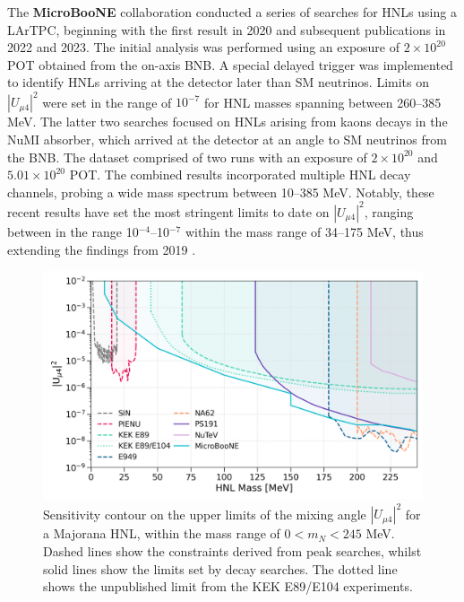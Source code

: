\begin{coloritemize}
\item The \textbf{MicroBooNE} collaboration conducted a series of searches for HNLs using a LArTPC, beginning with the first result in 2020 and subsequent publications in 2022 and 2023.
The initial analysis was performed using an exposure of $2 \times 10^{20}$ POT obtained from the on-axis BNB.
A special delayed trigger was implemented to identify HNLs arriving at the detector later than SM neutrinos.
Limits on $|U_{\mu4}|^{2}$ were set in the range of $10^{-7}$ for HNL masses spanning between 260--385 MeV.
The latter two searches focused on HNLs arising from kaons decays in the NuMI absorber, which arrived at the detector at an angle to SM neutrinos from the BNB.
The dataset comprised of two runs with an exposure of $2 \times 10^{20}$ and $5.01 \times 10^{20}$ POT.
The combined results incorporated multiple HNL decay channels, probing a wide mass spectrum between 10--385 MeV.
Notably, these recent results have set the most stringent limits to date on $|U_{\mu4}|^{2}$, ranging between in the range 10$^{-4}$--10$^{-7}$ within the mass range of 34--175 MeV, thus extending the findings from 2019 \cite{uboone1, uboone2, uboone3}.

\end{coloritemize}

\begin{figure}[t] 
\centering    
\includegraphics[width=1.0\textwidth]{sensitivity}
\caption[Sensitivity]{
Sensitivity contour on the upper limits of the mixing angle $|U_{\mu4}|^{2}$ for a Majorana HNL, within the mass range of $0 < m_{N} < 245$ MeV.
Dashed lines show the constraints derived from peak searches, whilst solid lines show the limits set by decay searches.
The dotted line shows the unpublished limit from the KEK E89/E104 experiments.
}
\label{fig:Sensitivity}
\end{figure}
